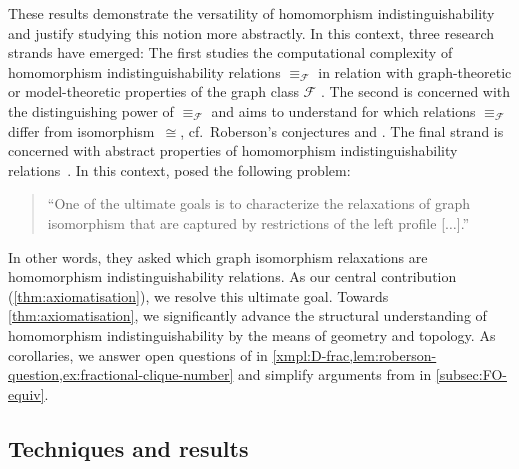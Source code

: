 \documentclass[11pt]{scrartcl}
\theoremstyle{definition}
\theoremstyle{plain}
\theoremstyle{remark}
\begin{document}
	These results demonstrate the versatility of homomorphism indistinguishability
	and justify studying this notion more abstractly. 
	In this context, three research strands have emerged:
	The first studies the computational complexity of homomorphism indistinguishability relations $\equiv_{\mathcal{F}}$ in relation with graph-theoretic or model-theoretic properties of the graph class $\mathcal{F}$ \cite{seppelt_algorithmic_2024,cerny_homomorphism_2026,curticapean_dense_2026}.
	The second is concerned with the distinguishing power of $\equiv_{\mathcal{F}}$ and aims to understand for which relations $\equiv_{\mathcal{F}}$ differ from isomorphism~$\cong$, cf.\ Roberson's conjectures \cite{roberson_oddomorphisms_2022} and \cite{neuen_distinguishing_2026,jimenez_homomorphism_2026,kristjansson_oddomorphisms_2026,kristjansson_counterexamples_2026}.
	The final strand is concerned with abstract properties of homomorphism indistinguishability relations~\cite{seppelt_logical_2024,atserias_expressive_2021,abramsky_discrete_2022,lichter_limitations_2024}.
	In this context, \textcite{atserias_expressive_2021} posed the following problem:
	\begin{quote}
		\enquote{One of the ultimate goals is to characterize the relaxations of graph isomorphism that are captured by restrictions of the left profile [$\ldots$].} \cite[Section~VIII]{atserias_expressive_2021}
	\end{quote}
	In other words, they asked which graph isomorphism relaxations are homomorphism indistinguishability relations. 
	As our central  contribution (\cref{thm:axiomatisation}), we resolve this ultimate goal.
	Towards \cref{thm:axiomatisation}, we significantly advance the structural understanding of homomorphism indistinguishability
	by
	the means of geometry and topology.
    As corollaries, we answer open questions of \textcite{roberson_oddomorphisms_2022,botteron_communication_2024,atserias_expressive_2021} in \cref{xmpl:D-frac,lem:roberson-question,ex:fractional-clique-number} and simplify arguments from \cite{atserias_expressive_2021} in \cref{subsec:FO-equiv}.

    \subsection*{Techniques and results}
    
\end{document}
